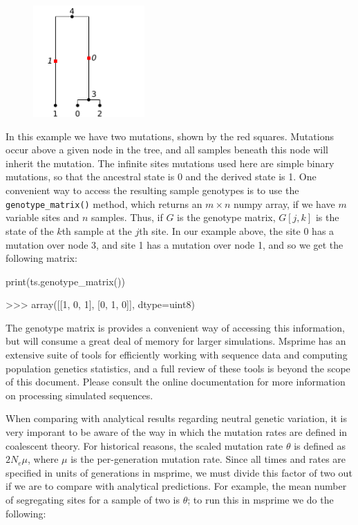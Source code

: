 \documentclass[graybox]{svmult}
\newcommand{\includenbimage}[1]{\begin{center}\texttt{[image: \#1]}\end{center}}
\begin{document}
\begin{figure}
  \begin{center}
    \includegraphics[width=0.38\textwidth]{images/simulations_19_0.pdf}
  \end{center}
\end{figure}
    In this example we have two mutations, shown by the red squares.
Mutations occur above a given node in the tree, and all samples beneath
this node will inherit the mutation. The infinite sites mutations used
here are simple binary mutations, so that the ancestral state is 0 and
the derived state is 1. One convenient way to access the resulting
sample genotypes is to use the \texttt{genotype\_matrix()} method, which
returns an \(m \times n\) numpy array, if we have \(m\) variable sites
and \(n\) samples. Thus, if \(G\) is the genotype matrix, \(G[j, k]\) is
the state of the \(k\)th sample at the \(j\)th site. In our example
above, the site 0 has a mutation over node 3, and site 1 has a mutation
over node 1, and so we get the following matrix:

\begin{pythoncode}
print(ts.genotype_matrix())

>>> array([[1, 0, 1],
           [0, 1, 0]], dtype=uint8)
\end{pythoncode}

    The genotype matrix is provides a convenient way of accessing this
information, but will consume a great deal of memory for larger
simulations. Msprime has an extensive suite of tools for efficiently
working with sequence data and computing population genetics statistics,
and a full review of these tools is beyond the scope of this document.
Please consult the online documentation for more information on
processing simulated sequences.

When comparing with analytical results regarding neutral genetic
variation, it is very imporant to be aware of the way in which the
mutation rates are defined in coalescent theory. For historical reasons,
the scaled mutation rate \(\theta\) is defined as \(2N_e \mu\), where
\(\mu\) is the per-generation mutation rate. Since all times and rates
are specified in units of generations in msprime, we must divide this
factor of two out if we are to compare with analytical predictions. For
example, the mean number of segregating sites for a sample of two is
\(\theta\); to run this in msprime we do the following:
\end{document}

